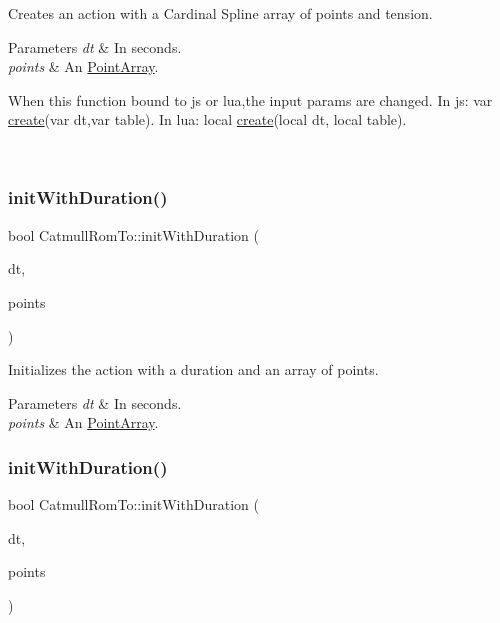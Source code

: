 Creates an action with a Cardinal Spline array of points and tension. 
\begin{DoxyParams}{Parameters}
{\em dt} & In seconds. \\
\hline
{\em points} & An \hyperlink{classPointArray}{Point\+Array}. 
\begin{DoxyCode}
When \textcolor{keyword}{this} \textcolor{keyword}{function} bound to js or lua,the input params are changed.
In js: var \hyperlink{classCatmullRomTo_a8bd98d010b26d17f96baa9b21b7ebd8e}{create}(var dt,var table).
In lua: local \hyperlink{classCatmullRomTo_a8bd98d010b26d17f96baa9b21b7ebd8e}{create}(local dt, local table).
\end{DoxyCode}
 \\
\hline
\end{DoxyParams}
\mbox{\label{classCatmullRomTo_aa7097d8400b43f18d9abcda9fad887fa}} 
\subsubsection{\texorpdfstring{init\+With\+Duration()}{initWithDuration()}\hspace{0.1cm}{\footnotesize\ttfamily [1/2]}}
{\footnotesize\ttfamily bool Catmull\+Rom\+To\+::init\+With\+Duration (\begin{DoxyParamCaption}\item[{float}]{dt,  }\item[{\hyperlink{classPointArray}{Point\+Array} $\ast$}]{points }\end{DoxyParamCaption})}

Initializes the action with a duration and an array of points.


\begin{DoxyParams}{Parameters}
{\em dt} & In seconds. \\
\hline
{\em points} & An \hyperlink{classPointArray}{Point\+Array}. \\
\hline
\end{DoxyParams}
\mbox{\label{classCatmullRomTo_aa7097d8400b43f18d9abcda9fad887fa}} 
\subsubsection{\texorpdfstring{init\+With\+Duration()}{initWithDuration()}\hspace{0.1cm}{\footnotesize\ttfamily [2/2]}}
{\footnotesize\ttfamily bool Catmull\+Rom\+To\+::init\+With\+Duration (\begin{DoxyParamCaption}\item[{float}]{dt,  }\item[{\hyperlink{classPointArray}{Point\+Array} $\ast$}]{points }\end{DoxyParamCaption})}


